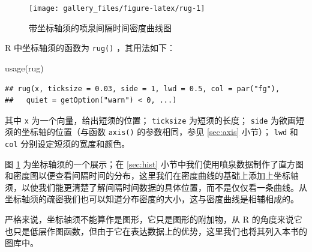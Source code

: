 \documentclass[
  b5paper,
  UTF8,twoside]{book}
\newenvironment{Shaded}{\begin{snugshade}}{\end{snugshade}}
\newcommand{\AttributeTok}[1]{\textcolor[rgb]{0.77,0.63,0.00}{#1}}
\newcommand{\DecValTok}[1]{\textcolor[rgb]{0.00,0.00,0.81}{#1}}
\newcommand{\FloatTok}[1]{\textcolor[rgb]{0.00,0.00,0.81}{#1}}
\newcommand{\FunctionTok}[1]{\textcolor[rgb]{0.00,0.00,0.00}{#1}}
\newcommand{\NormalTok}[1]{#1}
\newcommand{\SpecialCharTok}[1]{\textcolor[rgb]{0.00,0.00,0.00}{#1}}
\newcommand{\StringTok}[1]{\textcolor[rgb]{0.31,0.60,0.02}{#1}}
\begin{document}
\begin{Shaded}
\end{Shaded}

\begin{figure}

{\centering \texttt{[image: gallery\_files/figure-latex/rug-1]} 

}

\caption[带坐标轴须的喷泉间隔时间密度曲线图]{带坐标轴须的喷泉间隔时间密度曲线图}\label{fig:rug}
\end{figure}

R 中坐标轴须的函数为 \texttt{rug()} ，其用法如下：

\begin{Shaded}
\begin{Highlighting}[]
\FunctionTok{usage}\NormalTok{(rug)}
\end{Highlighting}
\end{Shaded}

\begin{verbatim}
## rug(x, ticksize = 0.03, side = 1, lwd = 0.5, col = par("fg"),
##   quiet = getOption("warn") < 0, ...)
\end{verbatim}

其中 \texttt{x} 为一个向量，给出短须的位置； \texttt{ticksize} 为短须的长度； \texttt{side} 为欲画短须的坐标轴的位置（与函数 \texttt{axis()} 的参数相同，参见 \ref{sec:axis} 小节）； \texttt{lwd} 和 \texttt{col} 分别设定短须的宽度和颜色。

图 \ref{fig:rug} 为坐标轴须的一个展示；在 \ref{sec:hist} 小节中我们使用喷泉数据制作了直方图和密度图以便查看间隔时间的分布，这里我们在密度曲线的基础上添加上坐标轴须，以使我们能更清楚了解间隔时间数据的具体位置，而不是仅仅看一条曲线。从坐标轴须的疏密我们也可以知道分布密度的大小，这与密度曲线是相辅相成的。

严格来说，坐标轴须不能算作是图形，它只是图形的附加物，从 R 的角度来说它也只是低层作图函数，但由于它在表达数据上的优势，这里我们也将其列入本书的图库中。
\end{document}
